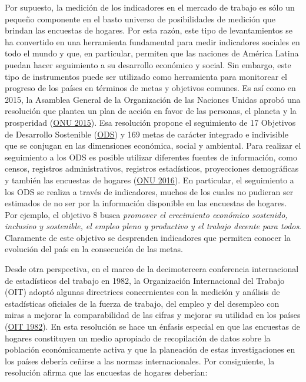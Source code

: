 \documentclass[
  12pt,
  spanish,
]{book}
\begin{document}
Por supuesto, la medición de los indicadores en el mercado de trabajo es sólo un pequeño componente en el basto universo de posibilidades de medición que brindan las encuestas de hogares. Por esta razón, este tipo de levantamientos se ha convertido en una herramienta fundamental para medir indicadores sociales en todo el mundo y que, en particular, permiten que las naciones de América Latina puedan hacer seguimiento a su desarrollo económico y social. Sin embargo, este tipo de instrumentos puede ser utilizado como herramienta para monitorear el progreso de los países en términos de metas y objetivos comunes. Es así como en 2015, la Asamblea General de la Organización de las Naciones Unidas aprobó una resolución que plantea un plan de acción en favor de las personas, el planeta y la prosperidad (\protect\hyperlink{ref-United_Nations_2015}{ONU 2015}). Esa resolución propone el seguimiento de 17 Objetivos de Desarrollo Sostenible (\href{https://sustainabledevelopment.un.org}{ODS}) y 169 metas de carácter integrado e indivisible que se conjugan en las dimensiones económica, social y ambiental. Para realizar el seguimiento a los ODS es posible utilizar diferentes fuentes de información, como censos, registros administrativos, registros estadísticos, proyecciones demográficas y también las encuestas de hogares (\protect\hyperlink{ref-United_Nations_2016}{ONU 2016}). En particular, el seguimiento a los ODS se realiza a través de indicadores, muchos de los cuales no pudieran ser estimados de no ser por la información disponible en las encuestas de hogares. Por ejemplo, el objetivo 8 busca \emph{promover el crecimiento económico sostenido, inclusivo y sostenible, el empleo pleno y productivo y el trabajo decente para todos}. Claramente de este objetivo se desprenden indicadores que permiten conocer la evolución del país en la consecución de las metas.

Desde otra perspectiva, en el marco de la decimotercera conferencia internacional de estadísticos del trabajo en 1982, la Organización Internacional del Trabajo (OIT) adoptó algunas directrices concernientes con la medición y análisis de estadísticas oficiales de la fuerza de trabajo, del empleo y del desempleo con miras a mejorar la comparabilidad de las cifras y mejorar su utilidad en los países (\protect\hyperlink{ref-OIT_1982}{OIT 1982}). En esta resolución se hace un énfasis especial en que las encuestas de hogares constituyen un medio apropiado de recopilación de datos sobre la población económicamente activa y que la planeación de estas investigaciones en los países debería ceñirse a las normas internacionales. Por consiguiente, la resolución afirma que las encuestas de hogares deberían:
\end{document}

